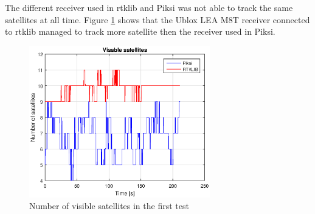 %
The different receiver used in \gls{rtklib} and Piksi was not able to track the same satellites at all time. Figure \ref{figure:NumSatWalk1} shows that the Ublox LEA M8T receiver connected to \gls{rtklib} managed to track more satellite then the receiver used in Piksi. 
\begin{figure}[H]
	\centering
		\includegraphics[width=0.7\textwidth]{figs/plots/numSatWalk1.eps}
		\caption{Number of visible satellites in the first test}
		\label{figure:NumSatWalk1}
\end{figure}
